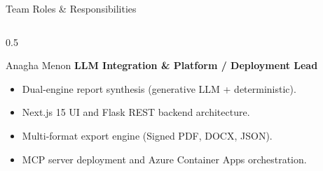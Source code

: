\documentclass[aspectratio=169, 10pt, professionalfonts]{beamer}
\begin{document}
\begin{frame}{Team Roles \& Responsibilities}
\begin{columns}[T]
\begin{column}{0.5\textwidth}
      \begin{block}{Anagha Menon}
        \textbf{LLM Integration \& Platform / Deployment Lead}
        \begin{itemize}\setlength{\itemsep}{0.3em}\footnotesize
          \item Dual-engine report synthesis (generative LLM + deterministic).
          \item Next.js 15 UI and Flask REST backend architecture.
          \item Multi-format export engine (Signed PDF, DOCX, JSON).
          \item MCP server deployment and Azure Container Apps orchestration.
        \end{itemize}
      \end{block}
    \end{column}
  \end{columns}
\end{frame}
\end{document}
